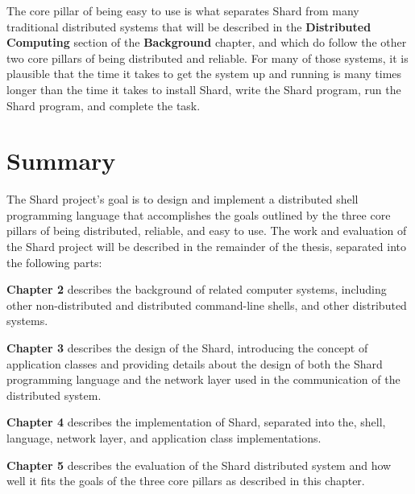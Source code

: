 \documentclass[twoside]{report}
\newcommand{\todoi}[1]{\todo[inline, color=blue!20]{TODO: {#1}}}
\begin{document}
The core pillar of being easy to use is what separates Shard from many traditional distributed systems that will be described in the \textbf{Distributed Computing} section of the \textbf{Background} chapter, and which do follow the other two core pillars of being distributed and reliable. For many of those systems, it is plausible that the time it takes to get the system up and running is many times longer than the time it takes to install Shard, write the Shard program, run the Shard program, and complete the task.

\section{Summary}

\todoi{Add story to motivate reader?}

The Shard project's goal is to design and implement a distributed shell programming language that accomplishes the goals outlined by the three core pillars of being distributed, reliable, and easy to use.
The work and evaluation of the Shard project will be described in the remainder of the thesis, separated into the following parts:

\textbf{Chapter 2} describes the background of related computer systems, including other non-distributed and distributed command-line shells, and other distributed systems.

\textbf{Chapter 3} describes the design of the Shard, introducing the concept of application classes and providing details about the design of both the Shard programming language and the network layer used in the communication of the distributed system.

\textbf{Chapter 4} describes the implementation of Shard, separated into the, shell, language, network layer, and application class implementations.

\textbf{Chapter 5} describes the evaluation of the Shard distributed system and how well it fits the goals of the three core pillars as described in this chapter.
\end{document}
